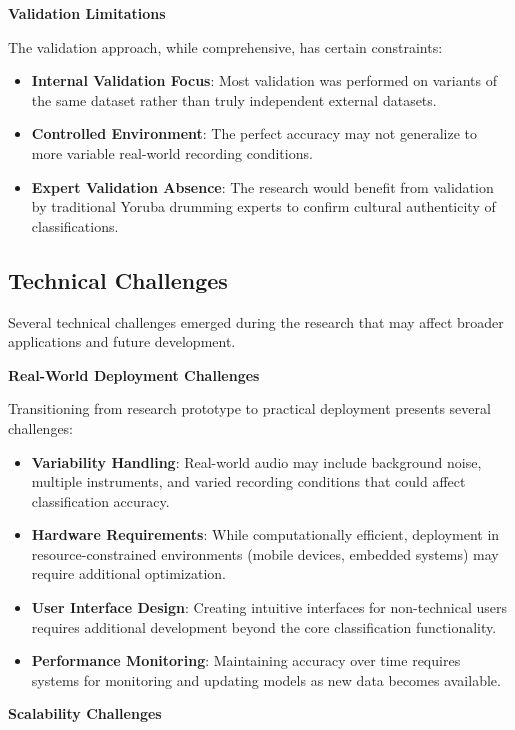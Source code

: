 \documentclass[12pt,a4paper]{article}
\begin{document}
\textbf{Validation Limitations}

The validation approach, while comprehensive, has certain constraints:

\begin{itemize}
\item \textbf{Internal Validation Focus}: Most validation was performed on variants of the same dataset rather than truly independent external datasets.
\item \textbf{Controlled Environment}: The perfect accuracy may not generalize to more variable real-world recording conditions.
\item \textbf{Expert Validation Absence}: The research would benefit from validation by traditional Yoruba drumming experts to confirm cultural authenticity of classifications.
\end{itemize}

\subsection{Technical Challenges}

Several technical challenges emerged during the research that may affect broader applications and future development.

\textbf{Real-World Deployment Challenges}

Transitioning from research prototype to practical deployment presents several challenges:

\begin{itemize}
\item \textbf{Variability Handling}: Real-world audio may include background noise, multiple instruments, and varied recording conditions that could affect classification accuracy.
\item \textbf{Hardware Requirements}: While computationally efficient, deployment in resource-constrained environments (mobile devices, embedded systems) may require additional optimization.
\item \textbf{User Interface Design}: Creating intuitive interfaces for non-technical users requires additional development beyond the core classification functionality.
\item \textbf{Performance Monitoring}: Maintaining accuracy over time requires systems for monitoring and updating models as new data becomes available.
\end{itemize}

\textbf{Scalability Challenges}
\end{document}
